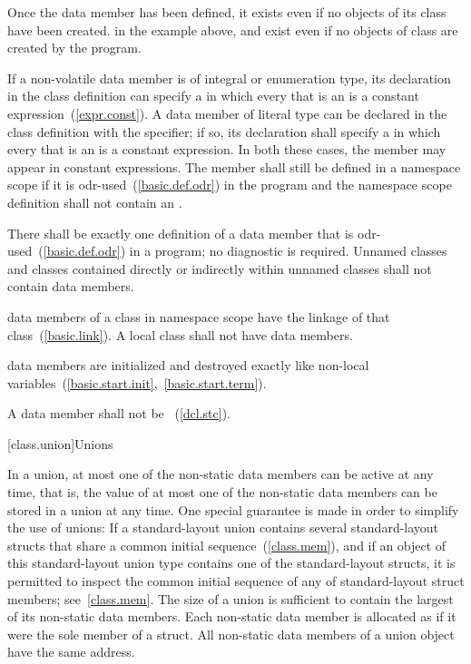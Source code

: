 \enternote
Once the  data member has been defined, it exists even if
no objects of its class have been created.
\enterexample
in the example above,  and  exist even
if no objects of class  are created by the program.
\exitexample
\exitnote

\pnum
If a non-volatile   data member is
of integral or enumeration type,
its declaration in the class definition can specify a
 in which every
 that is an 
is a constant expression~(\ref{expr.const}). A  data member of
literal type can be declared in the class definition with the
 specifier; if so, its declaration shall specify a
 in which every
 that is an 
is a constant expression. \enternote In both these cases,
the member may appear in constant expressions. \exitnote The
member shall still be defined in a namespace scope if
it is odr-used~(\ref{basic.def.odr}) in the program and the
namespace scope definition shall not contain an .

\pnum
\enternote
There shall be exactly one definition of a  data member
that is odr-used~(\ref{basic.def.odr}) in a program; no diagnostic is required.
\exitnote
Unnamed classes and classes contained directly
or indirectly within unnamed classes shall not contain 
data members.

\pnum
{}%
 data members of a class in namespace scope have
the linkage of that class~(\ref{basic.link}). A local class shall not have 
data members.

\pnum
{} data members are initialized and destroyed exactly like
non-local variables~(\ref{basic.start.init},~\ref{basic.start.term}).

\pnum
A  data member shall not be
~(\ref{dcl.stc}).

[class.union]{Unions}%

\pnum
In a union, at most one of the non-static data members can be active at any
time, that is, the value of at most one of the non-static data members can be
stored in a union at any time. \enternote One special guarantee is made in order to
simplify the use of unions: If a standard-layout union contains several standard-layout
structs that share a common initial sequence~(\ref{class.mem}), and if an object of this
standard-layout union type contains one of the standard-layout structs, it is permitted
to inspect the common initial sequence of any of standard-layout struct members;
see~\ref{class.mem}. \exitnote The size of a union is sufficient to contain the largest
of its non-static data members. Each non-static data member is allocated
as if it were the sole member of a struct. All non-static data members of a
union object have the same address.

